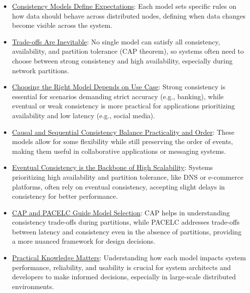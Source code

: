 \begin{itemize}
	\item \ul{Consistency Models Define Expectations}: Each model sets specific rules on how data should behave across distributed nodes, defining when data changes become visible across the system.
	\item \ul{Trade-offs Are Inevitable}: No single model can satisfy all consistency, availability, and partition tolerance (CAP theorem), so systems often need to choose between strong consistency and high availability, especially during network partitions.
	\item \ul{Choosing the Right Model Depends on Use Case}: Strong consistency is essential for scenarios demanding strict accuracy (e.g., banking), while eventual or weak consistency is more practical for applications prioritizing availability and low latency (e.g., social media).
	\item \ul{Causal and Sequential Consistency Balance Practicality and Order}: These models allow for some flexibility while still preserving the order of events, making them useful in collaborative applications or messaging systems.
	\item \ul{Eventual Consistency is the Backbone of High Scalability}: Systems prioritizing high availability and partition tolerance, like DNS or e-commerce platforms, often rely on eventual consistency, accepting slight delays in consistency for better performance.
	\item \ul{CAP and PACELC Guide Model Selection}: CAP helps in understanding consistency trade-offs during partitions, while PACELC addresses trade-offs between latency and consistency even in the absence of partitions, providing a more nuanced framework for design decisions.
	\item \ul{Practical Knowledge Matters}: Understanding how each model impacts system performance, reliability, and usability is crucial for system architects and developers to make informed decisions, especially in large-scale distributed environments.
\end{itemize}